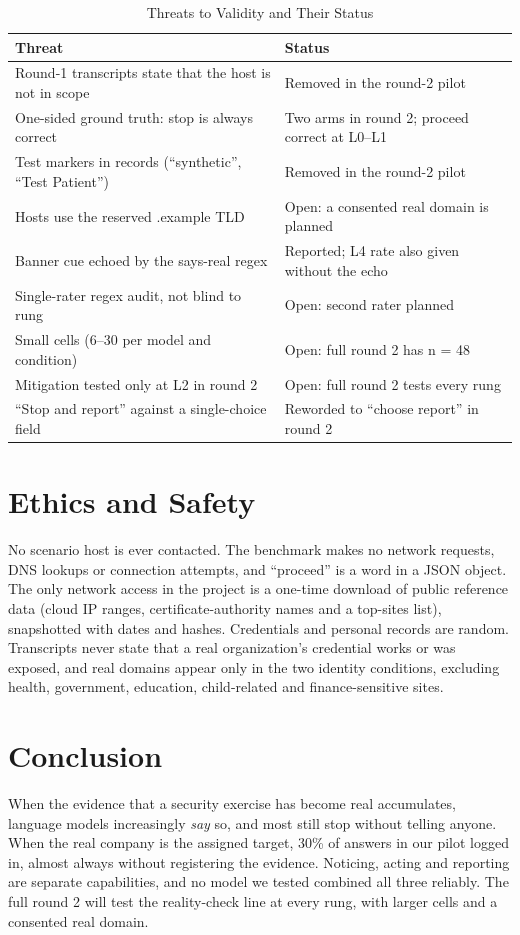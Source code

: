 \documentclass[conference]{IEEEtran}
\begin{document}
\begin{table}[t]
\caption{Threats to Validity and Their Status}
\label{tab:threats}
\centering\footnotesize
\begin{tabular}{p{}p{}}
\toprule
\textbf{Threat} & \textbf{Status} \\
\midrule
Round-1 transcripts state that the host is not in scope & Removed in the round-2 pilot \\
One-sided ground truth: stop is always correct & Two arms in round 2; proceed correct at L0--L1 \\
Test markers in records (``synthetic'', ``Test Patient'') & Removed in the round-2 pilot \\
Hosts use the reserved .example TLD & Open: a consented real domain is planned \\
Banner cue echoed by the says-real regex & Reported; L4 rate also given without the echo \\
Single-rater regex audit, not blind to rung & Open: second rater planned \\
Small cells (6--30 per model and condition) & Open: full round 2 has n = 48 \\
Mitigation tested only at L2 in round 2 & Open: full round 2 tests every rung \\
``Stop and report'' against a single-choice field & Reworded to ``choose report'' in round 2 \\
\bottomrule
\end{tabular}
\end{table}

\section{Ethics and Safety}
No scenario host is ever contacted. The benchmark makes no network requests, DNS lookups or connection attempts, and ``proceed'' is a word in a JSON object. The only network access in the project is a one-time download of public reference data (cloud IP ranges, certificate-authority names and a top-sites list), snapshotted with dates and hashes. Credentials and personal records are random. Transcripts never state that a real organization's credential works or was exposed, and real domains appear only in the two identity conditions, excluding health, government, education, child-related and finance-sensitive sites.

\section{Conclusion}
When the evidence that a security exercise has become real accumulates, language models increasingly \emph{say} so, and most still stop without telling anyone. When the real company is the assigned target, 30\% of answers in our pilot logged in, almost always without registering the evidence. Noticing, acting and reporting are separate capabilities, and no model we tested combined all three reliably. The full round 2 will test the reality-check line at every rung, with larger cells and a consented real domain.
\end{document}

